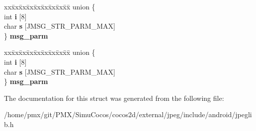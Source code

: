 \begin{DoxyCompactItemize}
\begin{tabbing}
\end{tabbing}\item 
\mbox{\label{structjpeg__error__mgr_a83442c2269ba95a0fc729850d8af9500}} 
\begin{tabbing}
xx\=xx\=xx\=xx\=xx\=xx\=xx\=xx\=xx\=\kill
union \{\\
\>int {\bfseries i} \mbox{[}8\mbox{]}\\
\>char {\bfseries s} \mbox{[}JMSG\_STR\_PARM\_MAX\mbox{]}\\
\} {\bfseries msg\_parm}\\

\end{tabbing}\item 
\mbox{\label{structjpeg__error__mgr_a8d91d4cd77cc9253da9eb5ff01c1ad06}} 
\begin{tabbing}
xx\=xx\=xx\=xx\=xx\=xx\=xx\=xx\=xx\=\kill
union \{\\
\>int {\bfseries i} \mbox{[}8\mbox{]}\\
\>char {\bfseries s} \mbox{[}JMSG\_STR\_PARM\_MAX\mbox{]}\\
\} {\bfseries msg\_parm}\\

\end{tabbing}\end{DoxyCompactItemize}


The documentation for this struct was generated from the following file\+:\begin{DoxyCompactItemize}
\item 
/home/pmx/git/\+P\+M\+X/\+Simu\+Cocos/cocos2d/external/jpeg/include/android/jpeglib.\+h\end{DoxyCompactItemize}
